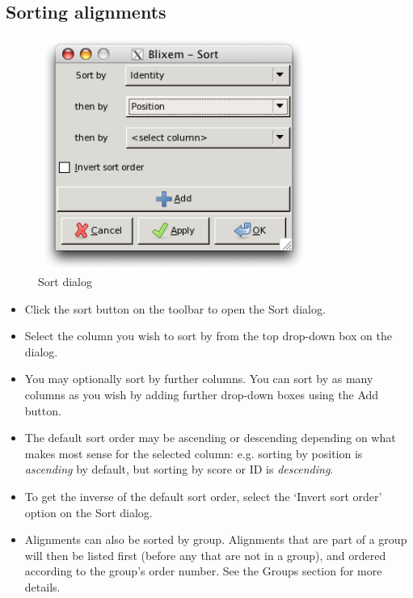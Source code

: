 \documentclass[letterpaper]{article}
\newcommand\liststyleWWviiiNumxxvi{%
\renewcommand\labelitemi{{\textbullet}}
\renewcommand\labelitemii{o}
\renewcommand\labelitemiii{[F0A7?]}
\renewcommand\labelitemiv{[F0B7?]}
}
\begin{document}
{\color[rgb]{0.30980393,0.5058824,0.7411765}\subsection[Sorting alignments]{Sorting alignments}}
\hypertarget{RefHeading2001056909880}{}\liststyleWWviiiNumxxvi

\begin{figure}
\centering
\color[rgb]{0.30980393,0.5058824,0.7411765}
\includegraphics[width=8.881cm,height=7.602cm]{img_dialog_sort.png}
\caption{Sort dialog}
\end{figure}

\liststyleWWviiiNumxxvi
\begin{itemize}
\item {Click the sort button on the toolbar to open the Sort dialog.}
\item {Select the column you wish to sort by from the top drop-down box on the dialog.}
\item {You may optionally sort by further columns. You can sort by as many columns as you wish by adding further drop-down boxes using the Add button.}
\item {The default sort order may be ascending or descending depending on what makes most sense for the selected column: e.g. sorting by position is \textit{ascending} by default, but sorting by score or ID is \textit{descending}.}
\item {To get the inverse of the default sort order, select the {\textquoteleft}Invert sort order{\textquoteright} option on the Sort dialog.}
\item {Alignments can also be sorted by group. Alignments that are part of a group will then be listed first (before any that are not in a group), and ordered according to the group{\textquoteright}s order number. See the Groups section for more details.}
\end{itemize}
\end{document}
